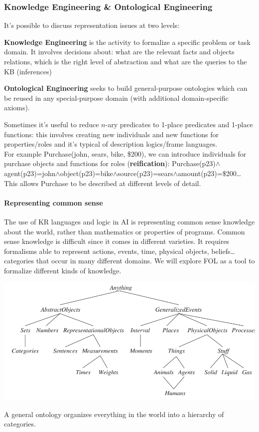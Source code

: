 \documentclass[10pt]{report}
\begin{document}
\subsubsection{Knowledge Engineering \& Ontological Engineering} It's possible to discuss representation issues at two levels:
\begin{list}{}{}
	\item \textbf{Knowledge Engineering} is the activity to formalize a specific problem or task domain. It involves decisions about: what are the relevant facts and objects relations, which is the right level of abstraction and what are the queries to the KB (inferences)
	\item \textbf{Ontological Engineering} seeks to build general-purpose ontologies which can be reused in any special-purpose domain (with additional domain-specific axioms).
\end{list}
Sometimes it's useful to reduce $n$-ary predicates to 1-place predicates and 1-place functions: this involves creating new individuals and new functions for properties/roles and it's typical of description logics/frame languages.\\
For example Purchase(john, sears, bike, \$200), we can introduce individuals for purchase objects and functions for roles (\textbf{reification}): Purchase(p23)$\wedge$agent(p23)=john$\wedge$object(p23)=bike$\wedge$source(p23)=sears$\wedge$amount(p23)=\$200\ldots\\
This allows Purchase to be described at different levels of detail.
\paragraph{Representing common sense} The use of KR languages and logic in AI is representing common sense knowledge about the world, rather than mathematics or properties of programs. Common sense knowledge is difficult since it comes in different varieties. It requires formalisms able to represent actions, events, time, physical objects, beliefs\ldots categories that occur in many different domains. We will explore FOL as a tool to formalize different kinds of knowledge.
\begin{center}
	\includegraphics[scale=0.5]{12.png}
\end{center}
A general ontology organizes everything in the world into a hierarchy of categories.
\end{document}
